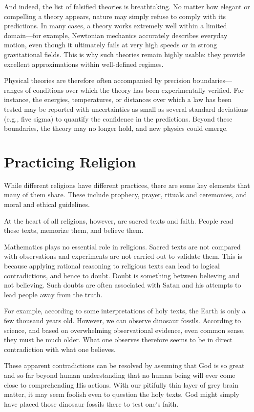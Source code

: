 And indeed, the list of falsified theories is breathtaking. No matter how elegant or compelling a theory appears, nature may simply refuse to comply with its predictions. In many cases, a theory works extremely well within a limited domain—for example, Newtonian mechanics accurately describes everyday motion, even though it ultimately fails at very high speeds or in strong gravitational fields. This is why such theories remain highly usable: they provide excellent approximations within well-defined regimes.

Physical theories are therefore often accompanied by precision boundaries—ranges of conditions over which the theory has been experimentally verified. For instance, the energies, temperatures, or distances over which a law has been tested may be reported with uncertainties as small as several standard deviations (e.g., five sigma) to quantify the confidence in the predictions. Beyond these boundaries, the theory may no longer hold, and new physics could emerge.


\section{Practicing Religion}

While different religions have different practices, there are some
key elements that many of them share. These include prophecy,
prayer, rituals and ceremonies, and moral and ethical guidelines.

At the heart of all religions, however, are sacred texts and
faith. People read these texts, memorize them, and believe
them.

Mathematics plays no essential role in religions. Sacred texts are not
compared with observations and  experiments are not carried out to validate them. This is because
applying rational reasoning to religious texts can lead to
logical contradictions, and hence to doubt. Doubt is something
between believing and not believing. Such doubts are often
associated with Satan and his attempts to lead people away
from the truth.

For example, according to some interpretations of holy texts,
the Earth is only a few thousand years old. However, we can
observe dinosaur fossils. According to science, and based on
overwhelming observational evidence, even common sense, they must be much older.
What one observes therefore seems to be in direct contradiction
with what one believes.

These apparent contradictions can be resolved by assuming that
God is so great and so far beyond human understanding that no
human being will ever come close to comprehending His actions.
With our pitifully thin layer of grey brain matter, it may seem
foolish even to question the holy texts. God might simply have
placed those dinosaur fossils there to test one's faith.

